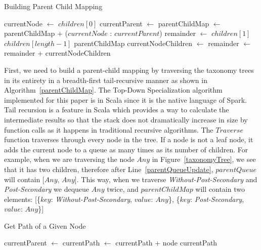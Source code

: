 \documentclass[11pt]{article}       %
\begin{document}
\begin{algorithm}[h]
\label{parentChildMap}
\caption{Building Parent Child Mapping}
\BlankLine
{} {
  \BlankLine
  currentNode $\leftarrow$ $children[0]$\;
  currentParent $\leftarrow$ \;
  parentChildMap $\leftarrow$ parentChildMap + ($currentNode$ : $currentParent$)\;
  remainder $\leftarrow$ $children[1]$ \KwTo $children[length - 1]$\;
  \BlankLine  
   {
    \KwRet parentChildMap\;
  }
  \BlankLine
   {
    \KwRet {}\;
  } {
    currentNodeChildren $\leftarrow$ \;
     
    remainder $\leftarrow$ remainder + currentNodeChildren\;
    \KwRet {}\;
  }

}
\end{algorithm}

First, we need to build a parent-child mapping by traversing the taxonomy trees in its entirety in a breadth-first tail-recursive manner as shown in Algorithm~\ref{parentChildMap}. The Top-Down Specialization algorithm implemented for this paper is in Scala since it is the native language of Spark. Tail recursion is a feature in Scala which provides a way to calculate the intermediate results so that the stack does not dramatically increase in size by function calls as it happens in traditional recursive algorithms. The $Traverse$ function traverses through every node in the tree. If a node is not a leaf node, it adds the current node to a queue as many times as its number of children. For example, when we are traversing the node $Any$ in Figure~\ref{taxonomyTree}, we see that it has two children, therefore after Line~\ref{parentQueueUpdate}, $parentQueue$ will contain [$Any$, $Any$]. This way, when we traverse \emph{Without-Post-Secondary} and \emph{Post-Secondary} we dequeue $Any$ twice, and $parentChildMap$ will contain two elements: [\{$key$: \emph{Without-Post-Secondary}, $value$: $Any$\}, \{$key$: \emph{Post-Secondary}, $value$: $Any$\}]

\begin{algorithm}[h]
\label{pathQueue}
\caption{Get Path of a Given Node}
\BlankLine
{} {
  \BlankLine
  currentParent $\leftarrow$ \;
  currentPath $\leftarrow$ currentPath + node\;
   {
    \KwRet currentPath\;
  } {
    \KwRet {}\;
  }
}
\end{algorithm}
\end{document}
